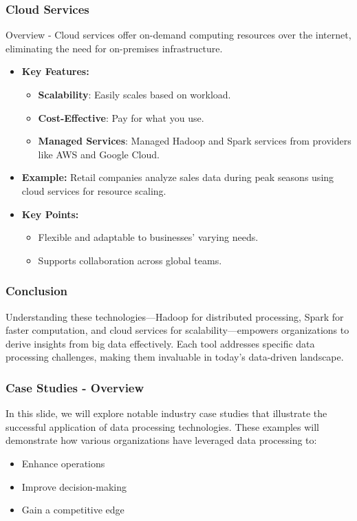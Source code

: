 \documentclass{beamer}
\begin{document}
\begin{frame}[fragile]
    \frametitle{Cloud Services}
    \begin{block}{Overview}
        - Cloud services offer on-demand computing resources over the internet, eliminating the need for on-premises infrastructure.
    \end{block}

    \begin{itemize}
        \item \textbf{Key Features:}
        \begin{itemize}
            \item \textbf{Scalability}: Easily scales based on workload.
            \item \textbf{Cost-Effective}: Pay for what you use.
            \item \textbf{Managed Services}: Managed Hadoop and Spark services from providers like AWS and Google Cloud.
        \end{itemize}
        
        \item \textbf{Example:} Retail companies analyze sales data during peak seasons using cloud services for resource scaling.
        
        \item \textbf{Key Points:}
        \begin{itemize}
            \item Flexible and adaptable to businesses' varying needs.
            \item Supports collaboration across global teams.
        \end{itemize}
    \end{itemize}
\end{frame}

\begin{frame}[fragile]
    \frametitle{Conclusion}
    Understanding these technologies—Hadoop for distributed processing, Spark for faster computation, and cloud services for scalability—empowers organizations to derive insights from big data effectively. Each tool addresses specific data processing challenges, making them invaluable in today's data-driven landscape.
\end{frame}

\begin{frame}[fragile]
    \frametitle{Case Studies - Overview}
    In this slide, we will explore notable industry case studies that illustrate the successful application of data processing technologies. These examples will demonstrate how various organizations have leveraged data processing to:
    \begin{itemize}
        \item Enhance operations
        \item Improve decision-making
        \item Gain a competitive edge
    \end{itemize}
\end{frame}
\end{document}
